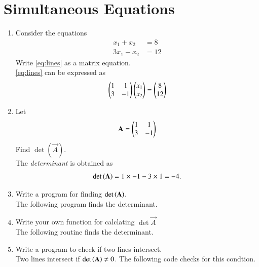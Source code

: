 \documentclass[journal,12pt,twocolumn]{IEEEtran}
\renewcommand\thesection{\arabic{section}}
\begin{document}
\section{Simultaneous Equations}
\begin{enumerate}[label=\thesection.\arabic*
,ref=\thesection.\theenumi]
%
\item Consider the equations
\begin{align}
\label{eq:lines}
 x_1 +x_2&=8
\\
 3x_1 -x_2&=12
\end{align}
Write \eqref{eq:lines} as a matrix equation.
\\
\solution \eqref{eq:lines} can be expressed as
\begin{align}
\label{eq:matrix}
\begin{pmatrix}1 & 1 \\ 3 & -1\end{pmatrix}\begin{pmatrix}x_1 \\x_2\end{pmatrix} = \begin{pmatrix}8 \\12\end{pmatrix}
\end{align}
\item Let 
\begin{align}
\label{eq:matrix_det}
\mathbf{A}= \begin{pmatrix}1 & 1 \\ 3 & -1\end{pmatrix}
\end{align}
Find $\det(\vec{A})$.
\\
\solution The {\em determinant} is obtained as
\begin{equation}
\det\left(\mathbf{A}\right) = 1 \times -1 - 3 \times 1 = -4.
\end{equation}
%
\item Write a program for finding $\det\left(\mathbf{A}\right)$.
\\
\solution The following program finds the determinant.

\item Write your own function for calclating $\det{\vec{A}}$
\\
\solution The following routine finds the determinant.

\item Write a program to check if two lines intersect.
\\
\solution Two lines intersect if $\det\left(\mathbf{A}\right) \ne 0$.  The following
code checks for this condtion.




\end{enumerate}
\end{document}
